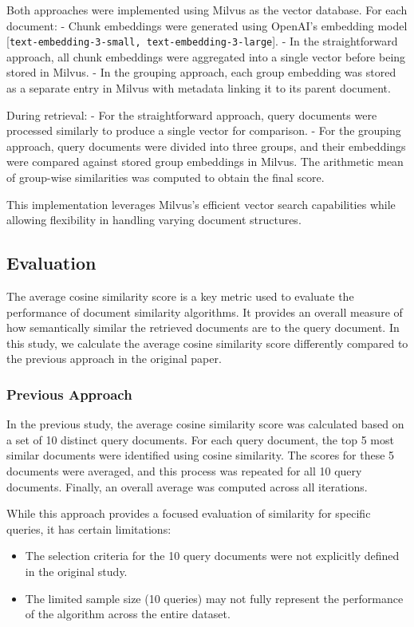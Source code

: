 \documentclass[12pt]{article}
\begin{document}
Both approaches were implemented using Milvus as the vector database. For each document:
- Chunk embeddings were generated using OpenAI’s embedding model [\texttt{text-embedding-3-small, text-embedding-3-large}].
- In the straightforward approach, all chunk embeddings were aggregated into a single vector before being stored in Milvus.
- In the grouping approach, each group embedding was stored as a separate entry in Milvus with metadata linking it to its parent document.

During retrieval:
- For the straightforward approach, query documents were processed similarly to produce a single vector for comparison.
- For the grouping approach, query documents were divided into three groups, and their embeddings were compared against stored group embeddings in Milvus. The arithmetic mean of group-wise similarities was computed to obtain the final score.

This implementation leverages Milvus's efficient vector search capabilities while allowing flexibility in handling varying document structures.

\subsection{Evaluation}

The average cosine similarity score is a key metric used to evaluate the performance of document similarity algorithms. It provides an overall measure of how semantically similar the retrieved documents are to the query document. In this study, we calculate the average cosine similarity score differently compared to the previous approach in the original paper.

\subsubsection{Previous Approach}

In the previous study, the average cosine similarity score was calculated based on a set of 10 distinct query documents. For each query document, the top 5 most similar documents were identified using cosine similarity. The scores for these 5 documents were averaged, and this process was repeated for all 10 query documents. Finally, an overall average was computed across all iterations.

While this approach provides a focused evaluation of similarity for specific queries, it has certain limitations:
\begin{itemize}
    \item The selection criteria for the 10 query documents were not explicitly defined in the original study.
    \item The limited sample size (10 queries) may not fully represent the performance of the algorithm across the entire dataset.
\end{itemize}
\end{document}
